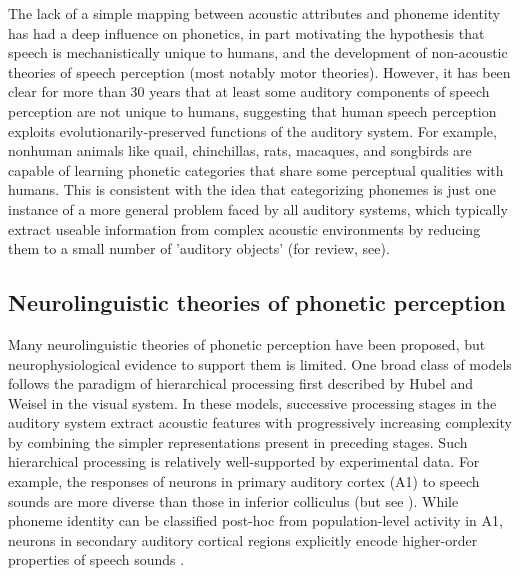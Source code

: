 The lack of a simple mapping between acoustic attributes and phoneme identity has had a deep influence on phonetics, in part motivating the hypothesis that speech is mechanistically unique to humans\cite{Lieberman1984}, and the development of non-acoustic theories of speech perception (most notably motor theories\cite{Diehl2004,Liberman1967,Liberman1985}). However, it has been clear for more than 30 years that at least some auditory components of speech perception are not unique to humans, suggesting that human speech perception exploits evolutionarily-preserved functions of the auditory system\cite{Kluender1987,Carbonell2014,Ghazanfar1999,Bornkessel-Schlesewsky2015}. For example, nonhuman animals like quail\cite{Kluender1987, Kluender1994}, chinchillas\cite{Kuhl1978}, rats\cite{Engineer2015}, macaques\cite{Kuhl1983}, and songbirds\cite{Dooling1995} are capable of learning phonetic categories that share some perceptual qualities with humans\cite{Lotto1997,Kluender2000}. This is consistent with the idea that categorizing phonemes is just one instance of a more general problem faced by all auditory systems, which typically extract useable information from complex acoustic environments by reducing them to a small number of 'auditory objects' (for review, see\cite{Bizley2013}).%
%
\subsection{Neurolinguistic theories of phonetic perception}

Many neurolinguistic theories of phonetic perception have been proposed\cite{Rauschecker2009a,Strauss2007,Kluender2013a,Liberman1985,Gaskell1997}, but neurophysiological evidence to support them is limited. One broad class of models follows the paradigm of hierarchical processing first described by Hubel and Weisel in the visual system\cite{Rauschecker2009a,Hubel1962,Strauss2007}. In these models, successive processing stages in the auditory system extract acoustic features with progressively increasing complexity by combining the simpler representations present in preceding stages. Such hierarchical processing is relatively well-supported by experimental data. For example, the responses of neurons in primary auditory cortex (A1) to speech sounds are more diverse than those in inferior colliculus\cite{Ranasinghe2013} (but see \cite{Bartlett2013}). While phoneme identity can be classified post-hoc from population-level activity in A1\cite{Centanni2013,Engineer2008,Steinschneider2003}, neurons in secondary auditory cortical regions explicitly encode higher-order properties of speech sounds \cite{Mesgarani2014,Belin2000a,Chang2010,Pasley2012,Bidelman2013}.

